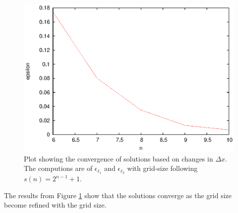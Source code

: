   
  \begin{figure}
    \centering
    \includegraphics{converge_spatial}
    \caption{Plot showing the convergence of solutions based on changes in $\Delta x$. The computions are of $\epsilon_{\ell_1}$ and $\epsilon_{\ell_2}$ with grid-size following $s(n) = 2^{n-1}+1$.}
    \label{fig:converge_spatial}
  \end{figure}

  The results from Figure \ref{fig:converge_spatial} show that the solutions converge as the grid size become refined with the grid size.


%
%
%
 
